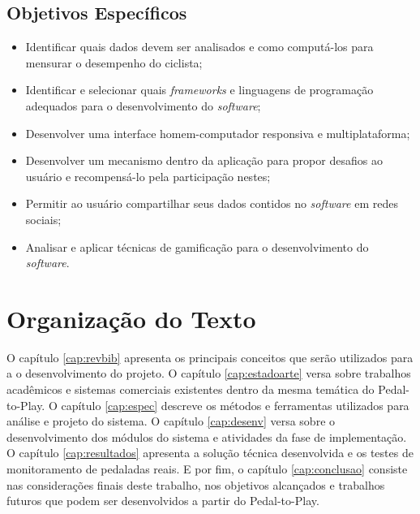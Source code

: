 \subsection{Objetivos Específicos}
\begin{itemize}
\item Identificar quais dados devem ser analisados e como computá-los para mensurar o desempenho do ciclista;
\item Identificar e selecionar quais \textit{frameworks} e linguagens de programação adequados para o desenvolvimento do \textit{software};
\item Desenvolver uma interface homem-computador responsiva e multiplataforma;
\item Desenvolver um mecanismo dentro da aplicação para propor desafios ao usuário e recompensá-lo pela participação nestes;
\item Permitir ao usuário compartilhar seus dados contidos no \textit{software} em redes sociais;
\item Analisar e aplicar técnicas de gamificação para o desenvolvimento do \textit{software}.
\end{itemize}



\section{Organização do Texto}
O capítulo \ref{cap:revbib} apresenta os principais conceitos que serão utilizados para a o desenvolvimento do projeto. O capítulo \ref{cap:estadoarte} versa sobre trabalhos acadêmicos e sistemas comerciais existentes dentro da mesma temática do Pedal-to-Play. O capítulo \ref{cap:espec} descreve os métodos e ferramentas utilizados para análise e projeto do sistema. O capítulo \ref{cap:desenv} versa sobre o desenvolvimento dos módulos do sistema e atividades da fase de implementação. O capítulo \ref{cap:resultados} apresenta a solução técnica desenvolvida e os testes de monitoramento de pedaladas reais. E por fim, o capítulo \ref{cap:conclusao} consiste nas considerações finais deste trabalho, nos objetivos alcançados e trabalhos futuros que podem ser desenvolvidos a partir do Pedal-to-Play.



